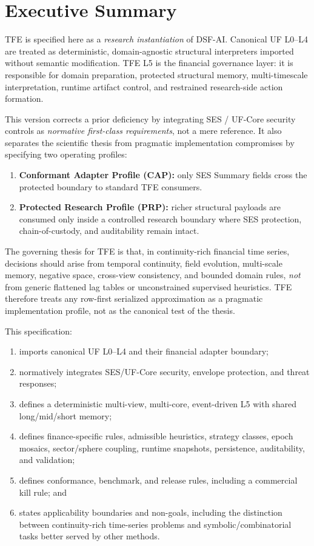 \documentclass[11pt]{report}
\begin{document}
\tableofcontents
\clearpage

\chapter*{Executive Summary}
TFE is specified here as a \emph{research instantiation} of DSF-AI. Canonical UF L0--L4 are treated as deterministic, domain-agnostic structural interpreters imported without semantic modification. TFE L5 is the financial governance layer: it is responsible for domain preparation, protected structural memory, multi-timescale interpretation, runtime artifact control, and restrained research-side action formation.

This version corrects a prior deficiency by integrating SES / UF-Core security controls as \emph{normative first-class requirements}, not a mere reference. It also separates the scientific thesis from pragmatic implementation compromises by specifying two operating profiles:
\begin{enumerate}[leftmargin=1.2cm]
    \item \textbf{Conformant Adapter Profile (CAP):} only SES Summary fields cross the protected boundary to standard TFE consumers.
    \item \textbf{Protected Research Profile (PRP):} richer structural payloads are consumed only inside a controlled research boundary where SES protection, chain-of-custody, and auditability remain intact.
\end{enumerate}

The governing thesis for TFE is that, in continuity-rich financial time series, decisions should arise from temporal continuity, field evolution, multi-scale memory, negative space, cross-view consistency, and bounded domain rules, \emph{not} from generic flattened lag tables or unconstrained supervised heuristics. TFE therefore treats any row-first serialized approximation as a pragmatic implementation profile, not as the canonical test of the thesis.

This specification:
\begin{enumerate}[leftmargin=1.2cm]
    \item imports canonical UF L0--L4 and their financial adapter boundary;
    \item normatively integrates SES/UF-Core security, envelope protection, and threat responses;
    \item defines a deterministic multi-view, multi-core, event-driven L5 with shared long/mid/short memory;
    \item defines finance-specific rules, admissible heuristics, strategy classes, epoch mosaics, sector/sphere coupling, runtime snapshots, persistence, auditability, and validation;
    \item defines conformance, benchmark, and release rules, including a commercial kill rule; and
    \item states applicability boundaries and non-goals, including the distinction between continuity-rich time-series problems and symbolic/combinatorial tasks better served by other methods.
\end{enumerate}
\end{document}
